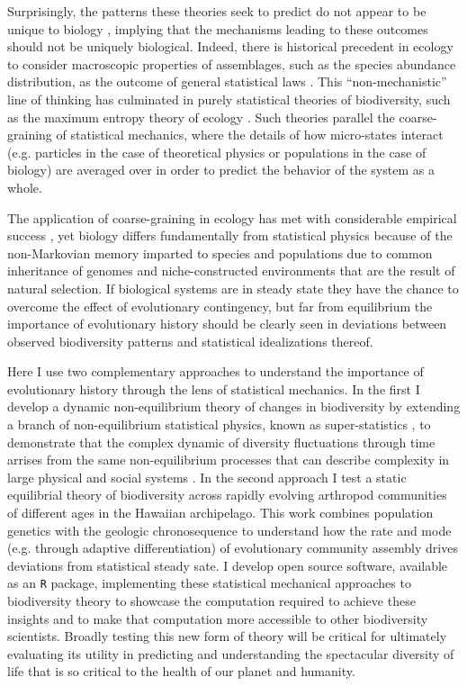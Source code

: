 Surprisingly, the patterns these theories seek to predict do not
appear to be unique to biology \citep{nekola2007}, implying that the
mechanisms leading to these outcomes should not be uniquely
biological.  Indeed, there is historical precedent in ecology to
consider macroscopic properties of assemblages, such as the species
abundance distribution, as the outcome of general statistical laws
\citep{fisher1943, preston1950, preston1962a, preston1962b}. This
``non-mechanistic'' line of thinking has culminated in purely
statistical theories of biodiversity, such as the maximum entropy
theory of ecology \citep{harte2011}. Such theories parallel the
coarse-graining of statistical mechanics, where the details of how
micro-states interact (e.g. particles in the case of theoretical
physics or populations in the case of biology) are averaged over in
order to predict the behavior of the system as a whole.

The application of coarse-graining in ecology has met with
considerable empirical success \citep[e.g.][]{banavar2007, pueyo2007,
  dewar2008, harte2011}, yet biology differs fundamentally from
statistical physics because of the non-Markovian memory imparted to
species and populations due to common inheritance of genomes and
niche-constructed environments \citep{odling2003} that are the result
of natural selection.  If biological systems are in steady state they
have the chance to overcome the effect of evolutionary contingency,
but far from equilibrium the importance of evolutionary history should
be clearly seen in deviations between observed biodiversity patterns
and statistical idealizations thereof.

Here I use two complementary approaches to understand the importance
of evolutionary history through the lens of statistical mechanics.
In the first I develop a dynamic non-equilibrium theory of changes in
biodiversity by extending a branch of non-equilibrium statistical
physics, known as super-statistics \citep{beck2003, beck2004}, to
demonstrate that the complex dynamic of diversity fluctuations
through time arrises from the same non-equilibrium processes that can
describe complexity in large physical \citep{beck2004} and social
systems \citep{fuentes2009}.  In the second approach I test a static
equilibrial theory of biodiversity \citep[the maximum entropy theory
of ecology][]{harte2011} across rapidly evolving arthropod
communities of different ages in the Hawaiian archipelago. This work
combines population genetics with the geologic chronosequence to
understand how the rate and mode (e.g. through adaptive
differentiation) of evolutionary community assembly drives deviations
from statistical steady sate. I develop open source software,
available as an \texttt{R} package, implementing these statistical
mechanical approaches to biodiversity theory to showcase the
computation required to achieve these insights and to make that
computation more accessible to other biodiversity scientists.  Broadly
testing this new form of theory will be critical for ultimately
evaluating its utility in predicting and understanding the spectacular
diversity of life that is so critical to the health of our planet and
humanity.


\printbibliography[heading=subbibliography]

